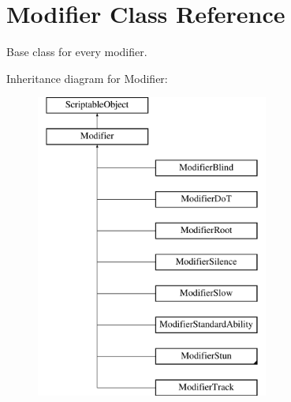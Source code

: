 \hypertarget{class_modifier}{}\section{Modifier Class Reference}
\label{class_modifier}


Base class for every modifier.  


Inheritance diagram for Modifier\+:\begin{figure}[H]
\begin{center}
\leavevmode
\includegraphics[height=10.000000cm]{class_modifier}
\end{center}
\end{figure}

